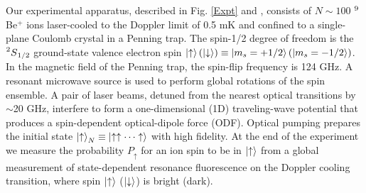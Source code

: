 \documentclass[aps,prl,twocolumn,superscriptaddress,floatfix]{revtex4-1}
\begin{document}
Our experimental apparatus, described in Fig. \ref{Expt} and \citep{Bollinger2013,Sawyer2014,Bohnet2015}, consists of $N\sim100$ $\prescript{9}{}{}$Be$^{+}$ ions laser-cooled to the Doppler limit of 0.5 mK and confined to a single-plane Coulomb crystal in a Penning trap. The spin-1/2 degree of freedom is the $\prescript{2}{}{S}_{1/2}$ ground-state valence electron spin $\ket{\uparrow} (\ket{\downarrow}) \equiv \ket{m_{s}=+1/2} (\ket{m_{s}=-1/2}) $. In the magnetic field of the Penning trap, the spin-flip frequency is 124 GHz. A resonant microwave source is used to perform global rotations of the spin ensemble. A pair of laser beams, detuned from the nearest optical transitions by $\sim$20 GHz, interfere to form a one-dimensional (1D) traveling-wave potential that produces a spin-dependent optical-dipole force (ODF). Optical pumping prepares the initial state $\ket{\uparrow}_N \equiv \ket{\uparrow \uparrow \cdots \uparrow}$ with high fidelity. At the end of the experiment we measure the probability $P_\uparrow$ for an ion spin to be in $\ket{\uparrow}$ from a global measurement of state-dependent resonance fluorescence on the Doppler cooling transition, where spin $\ket{\uparrow}$ ($\ket{\downarrow}$) is bright (dark).
\end{document}
